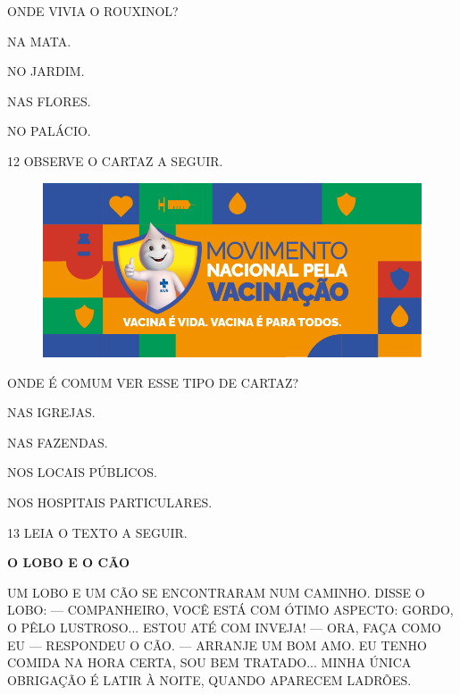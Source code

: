 ONDE VIVIA O ROUXINOL?

\begin{escolha}

\item NA MATA.

\item NO JARDIM.

\item NAS FLORES.

\item NO PALÁCIO. 

\end{escolha}

\num{12} OBSERVE O CARTAZ A SEGUIR.

\begin{figure}[H]
\centering
\includegraphics[width=.6\textwidth]{./media/image228.png}
\end{figure}

ONDE É COMUM VER ESSE TIPO DE CARTAZ?

\begin{escolha}

\item NAS IGREJAS.

\item NAS FAZENDAS.

\item NOS LOCAIS PÚBLICOS.

\item NOS HOSPITAIS PARTICULARES.

\end{escolha}

\num{13} LEIA O TEXTO A SEGUIR.

\begin{myquote}
\textbf{O LOBO E O CÃO}

UM LOBO E UM CÃO SE ENCONTRARAM NUM CAMINHO. DISSE O LOBO: — COMPANHEIRO, VOCÊ ESTÁ COM ÓTIMO ASPECTO: GORDO, O PÊLO LUSTROSO... ESTOU ATÉ COM INVEJA! — ORA, FAÇA COMO EU — RESPONDEU O CÃO. — ARRANJE UM BOM AMO. EU TENHO COMIDA NA HORA CERTA, SOU BEM TRATADO... MINHA ÚNICA OBRIGAÇÃO É LATIR À NOITE, QUANDO APARECEM LADRÕES. 

\end{myquote}

